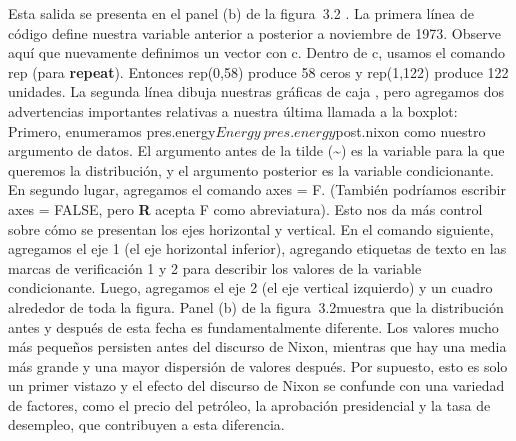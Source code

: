 \documentclass[
]{book}
\newenvironment{Shaded}{\begin{snugshade}}{\end{snugshade}}
\newcommand{\AttributeTok}[1]{\textcolor[rgb]{0.77,0.63,0.00}{#1}}
\newcommand{\DecValTok}[1]{\textcolor[rgb]{0.00,0.00,0.81}{#1}}
\newcommand{\FunctionTok}[1]{\textcolor[rgb]{0.00,0.00,0.00}{#1}}
\newcommand{\NormalTok}[1]{#1}
\newcommand{\OtherTok}[1]{\textcolor[rgb]{0.56,0.35,0.01}{#1}}
\newcommand{\SpecialCharTok}[1]{\textcolor[rgb]{0.00,0.00,0.00}{#1}}
\newcommand{\StringTok}[1]{\textcolor[rgb]{0.31,0.60,0.02}{#1}}
\begin{document}
\begin{Shaded}
\end{Shaded}

Esta salida se presenta en el panel (b) de la figura  3.2 . La primera línea de código define nuestra variable anterior a posterior a noviembre de 1973. Observe aquí que nuevamente definimos un vector con c. Dentro de c, usamos el comando rep (para \textbf{repeat}). Entonces rep(0,58) produce 58 ceros y rep(1,122) produce 122 unidades. La segunda línea dibuja nuestras gráficas de caja , pero agregamos dos advertencias importantes relativas a nuestra última llamada a la boxplot: Primero, enumeramos pres.energy\(Energy~pres.energy\)post.nixon como nuestro argumento de datos. El argumento antes de la tilde (\textasciitilde{}) es la variable para la que queremos la distribución, y el argumento posterior es la variable condicionante. En segundo lugar, agregamos el comando axes = F. (También podríamos escribir axes = FALSE, pero \textbf{R} acepta F como abreviatura). Esto nos da más control sobre cómo se presentan los ejes horizontal y vertical. En el comando siguiente, agregamos el eje 1 (el eje horizontal inferior), agregando etiquetas de texto en las marcas de verificación 1 y 2 para describir los valores de la variable condicionante. Luego, agregamos el eje 2 (el eje vertical izquierdo) y un cuadro alrededor de toda la figura. Panel (b) de la figura  3.2muestra que la distribución antes y después de esta fecha es fundamentalmente diferente. Los valores mucho más pequeños persisten antes del discurso de Nixon, mientras que hay una media más grande y una mayor dispersión de valores después. Por supuesto, esto es solo un primer vistazo y el efecto del discurso de Nixon se confunde con una variedad de factores, como el precio del petróleo, la aprobación presidencial y la tasa de desempleo, que contribuyen a esta diferencia.
\end{document}
